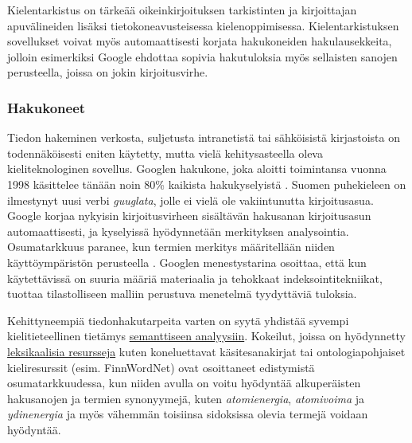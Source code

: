 \documentclass[]{../../metanetpaper}
\begin{document}
\begin{multicols}{2}
Kielentarkistus on tärkeää oikeinkirjoituksen tarkistinten ja
kirjoittajan apuvälineiden lisäksi tietokoneavusteisessa
kielenoppimisessa.  Kielentarkistuksen sovellukset voivat myös
automaattisesti korjata hakukoneiden hakulausekkeita, jolloin
esimerkiksi Google ehdottaa sopivia hakutuloksia myös sellaisten
sanojen perusteella, joissa on jokin kirjoitusvirhe.



\subsubsection{Hakukoneet}


Tiedon hakeminen verkosta, suljetusta intranetistä tai sähköisistä
kirjastoista on todennäköisesti eniten käytetty, mutta
vielä kehitysasteella oleva kieliteknologinen sovellus. Googlen
hakukone, joka aloitti toimintansa vuonna 1998 käsittelee tänään noin
80\% kaikista hakukyselyistä \cite{Spiegel}. Suomen puhekieleen on
ilmestynyt uusi verbi \textit{guuglata}, jolle ei vielä
ole vakiintunutta kirjoitusasua. Google korjaa nykyisin kirjoitusvirheen
sisältävän hakusanan kirjoitusasun automaattisesti, ja kyselyissä hyödynnetään
merkityksen analysointia. Osumatarkkuus paranee, kun termien 
merkitys määritellään niiden käyttöympäristön perusteella \cite{Google-rolls}. 
Googlen menestystarina osoittaa, että kun käytettävissä on suuria määriä 
materiaalia ja tehokkaat indeksointitekniikat, tuottaa tilastolliseen malliin
perustuva menetelmä tyydyttäviä tuloksia.

Kehittyneempiä tiedonhakutarpeita varten on syytä yhdistää
syvempi kielitieteellinen tietämys \underline{semanttiseen analyysiin}.
Kokeilut, joissa on hyödynnetty \underline{leksikaalisia resursseja} kuten koneluettavat
käsitesanakirjat tai ontologiapohjaiset kieliresurssit
(esim. FinnWordNet) ovat osoittaneet edistymistä osumatarkkuudessa, kun niiden 
avulla on voitu hyödyntää alkuperäisten hakusanojen ja termien synonyymejä, kuten
\textit{atomienergia},
\textit{atomivoima} ja
\textit{ydinenergia}
ja myös vähemmän toisiinsa sidoksissa olevia termejä
voidaan hyödyntää.



\end{multicols}
\end{document}
